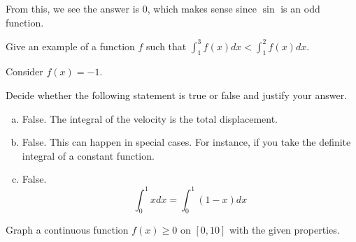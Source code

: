 \documentclass[11pt]{exam}
\begin{document}
\begin{questions}
\begin{solution}
\begin{enumerate}[(a)]
    From this, we see the answer is 0, which makes sense since
    \(\sin\) is an odd function.
    \end{enumerate}
  \end{solution}
\question Give an example of a function \(f\) such that \(\int_1^3
  f(x) dx < \int_1^2 f(x) dx\).
  \begin{solution}
   Consider \(f(x) = -1\). 
  \end{solution}
\question Decide whether the following statement is true or false and
  justify your answer.
  \begin{solution}
    \begin{enumerate}[(a)]
    \item False. The integral of the velocity is the total displacement.
    \item False. This can happen in special cases. For instance, if
      you take the definite integral of a constant function.
    \item False. \[
        \int_0^1 x dx = \int_0^1 (1-x) dx
      \] 
    \end{enumerate}
  \end{solution}
\question Graph a continuous function \(f(x) \geq 0\) on \([0,10]\)
  with the given properties.
\end{questions}
\end{document}
